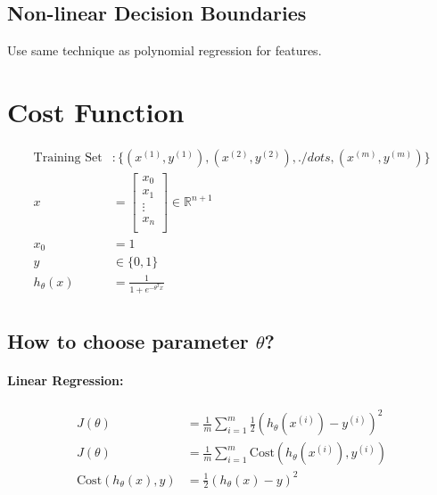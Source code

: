 \documentclass[a4paper, 12pt]{report}
\def\R{\mathbb{R}}
\def\half{\frac{1}{2}}
\begin{document}
\subsection*{Non-linear Decision Boundaries}
Use same technique as polynomial regression for features.

\section{Cost Function}
\begin{align*}
	\text{Training Set} & :
	\{(x^{(1)}, y^{(1)}), (x^{(2)}, y^{(2)}), ./dots, (x^{(m)}, y^{(m)})\} \\
	x                   & = \begin{bmatrix}
		x_0    \\
		x_1    \\
		\vdots \\
		x_n    \\
	\end{bmatrix} \in \R^{n+1}        \\
	x_0                 & = 1                                              \\
	y                   & \in \{0, 1\}                                     \\
	h_\theta(x)         & = \frac{1}{1 + e^{-\theta^Tx}}                   \\
\end{align*}

\subsection*{How to choose parameter $\theta$?}

\paragraph{Linear Regression:}
\begin{align*}
	J(\theta)                     & =
	\frac{1}{m}\sum_{i = 1}^m\half(h_\theta(x^{(i)}) - y^{(i)})^2      \\
	J(\theta)                     & =
	\frac{1}{m}\sum_{i = 1}^m\mathrm{Cost}(h_\theta(x^{(i)}), y^{(i)}) \\
	\mathrm{Cost}(h_\theta(x), y) & = \half(h_\theta(x) - y)^2         \\
\end{align*}
\end{document}
